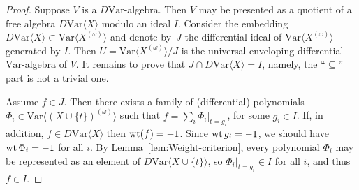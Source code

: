 \documentclass[10pt,a4paper]{amsart}
\numberwithin{equation}{section}
\def\Var{\mathrm{Var}}
\def\wt {\mathop {\fam 0 wt}\nolimits}
\begin{document}
\begin{proof}
Suppose $V$ is a $D\Var $-algebra.
Then $V$ may be presented as a quotient
of a free algebra $D\Var\langle X\rangle $ modulo an ideal $I$.
Consider the embedding $D\Var\langle X\rangle \subset \Var\bigl\langle X^{(\omega )}\bigr\rangle $
and denote by~$J$ the differential ideal of $\Var\bigl\langle X^{(\omega )}\bigr\rangle $
generated by $I$.
Then $U = \Var \bigl\langle X^{(\omega )}\bigr\rangle /J$ is the universal enveloping
differential $\Var $-algebra of $V$. It remains to prove that $J\cap D\Var\langle X\rangle = I$,
namely, the ``$\subseteq $'' part is not a trivial one.

Assume $f\in J$. Then there exists a family of (differential) polynomials
$\Phi_i \in \Var\bigl\langle (X\cup\{t\})^{(\omega )} \bigr\rangle $
such that $f = \sum_i \Phi_i|_{t=g_i}$, for some $g_i\in I$.
If, in addition, $f\in D\Var\langle X\rangle $ then
$\wt (f)=-1$. Since $\wt g_i=-1$, we should have $\wt \Phi_i=-1$ for all $i$.
By Lemma~\ref{lem:Weight-criterion}, every polynomial $\Phi_i$ may be
represented as an element of $D\Var\langle X\cup\{t\}\rangle $,
so $\Phi_i|_{t=g_i} \in I$ for all $i$, and thus $f\in I$.
\end{proof}
\end{document}
